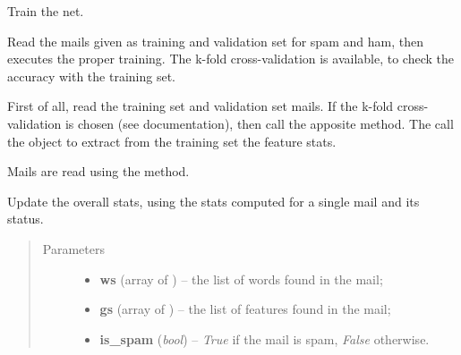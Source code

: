 \documentclass[letterpaper,10pt,english]{sphinxmanual}
\begin{document}
\begin{fulllineitems}
\begin{fulllineitems}
\label{index:naive_bayes.Bayes.train}
Train the net.

Read the mails given as training and validation set for spam and ham,
then executes the proper training. The k-fold cross-validation is
available, to check the accuracy with the training set.

First of all, read the training set and validation set mails.
If the k-fold cross-validation is chosen (see {\hyperref[index:config.Config]{}}
documentation), then call the apposite method. The call the
{\hyperref[index:trainer.Trainer]{}} object to extract from the training set
the feature stats.

Mails are read using the {\hyperref[index:naive_bayes.Bayes.load_mails]{}} method.

\end{fulllineitems}


\begin{fulllineitems}
\label{index:naive_bayes.Bayes.update_stats}
Update the overall stats, using the stats computed for a single mail
and its status.
\begin{quote}\begin{description}
\item[{Parameters}] \leavevmode\begin{itemize}
\item {} 
\textbf{ws} (array of {\hyperref[index:test_stat.Test_word]{}}) -- the list of words found in the mail;

\item {} 
\textbf{gs} (array of {\hyperref[index:test_stat.Test_stat]{}}) -- the list of features found in the mail;

\item {} 
\textbf{is\_spam} (\emph{bool}) -- \emph{True} if the mail is spam, \emph{False} otherwise.

\end{itemize}

\end{description}\end{quote}

\end{fulllineitems}


\end{fulllineitems}
\end{document}
